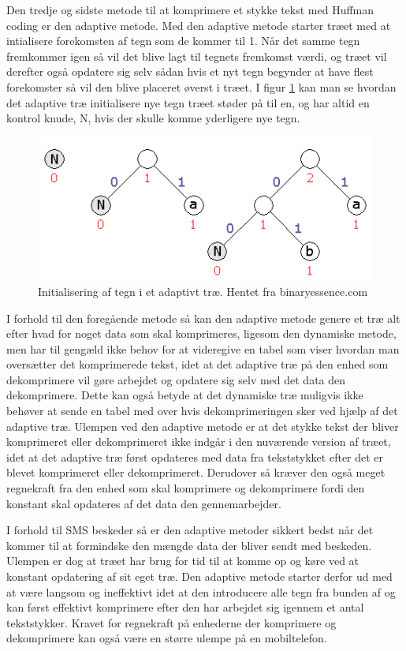 Den tredje og sidste metode til at komprimere et stykke tekst med Huffman coding er den adaptive metode. Med den adaptive metode starter træet med at intialisere forekomsten af tegn som de kommer til 1. Når det samme tegn fremkommer igen så vil det blive lagt til tegnets fremkomst værdi, og træet vil derefter også opdatere sig selv sådan hvis et nyt tegn begynder at have flest forekomster så vil den blive placeret øverst i træet. I figur \ref{fig:adaptive_tree} kan man se hvordan det adaptive træ initialisere nye tegn træet støder på til en, og har altid en kontrol knude, N, hvis der skulle komme yderligere nye tegn.

\begin{figure}[H]
\centering
\includegraphics[width=\linewidth]{Billeder/adaptivt.png}
\caption{Initialisering af tegn i et adaptivt træ. Hentet fra binaryessence.com}
\label{fig:adaptive_tree}
\end{figure}

I forhold til den foregående metode så kan den adaptive metode genere et træ alt efter hvad for noget data som skal komprimeres, ligesom den dynamiske metode, men har til gengæld ikke behov for at videregive en tabel som viser hvordan man oversætter det komprimerede tekst, idet at det adaptive træ på den enhed som dekomprimere vil gøre arbejdet og opdatere sig selv med det data den dekomprimere. Dette kan også betyde at det dynamiske træ muligvis ikke behøver at sende en tabel med over hvis dekomprimeringen sker ved hjælp af det adaptive træ. Ulempen ved den adaptive metode er at det stykke tekst der bliver komprimeret eller dekomprimeret ikke indgår i den nuværende version af træet, idet at det adaptive træ først opdateres med data fra tekststykket efter det er blevet komprimeret eller dekomprimeret. Derudover så kræver den også meget regnekraft fra den enhed som skal komprimere og dekomprimere fordi den konstant skal opdateres af det data den gennemarbejder. \cite{Hufftree_5}

I forhold til SMS beskeder så er den adaptive metoder sikkert bedst når det kommer til at formindske den mængde data der bliver sendt med beskeden. Ulempen er dog at træet har brug for tid til at komme op og køre ved at konstant opdatering af sit eget træ. Den adaptive metode starter derfor ud med at være langsom og ineffektivt idet at den introducere alle tegn fra bunden af og kan først effektivt komprimere efter den har arbejdet sig igennem et antal tekststykker. Kravet for regnekraft på enhederne der komprimere og dekomprimere kan også være en større ulempe på en mobiltelefon.
